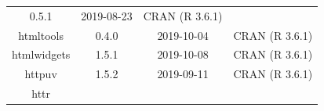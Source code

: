 \documentclass[11pt,]{book}
\begin{document}
\begin{longtable}[]{@{}cccc@{}}
\begin{minipage}[t]{0.19\columnwidth}
0.5.1\strut
\end{minipage} & \begin{minipage}[t]{0.16\columnwidth}\centering\strut
2019-08-23\strut
\end{minipage} & \begin{minipage}[t]{0.36\columnwidth}\centering\strut
CRAN (R 3.6.1)\strut
\end{minipage}\tabularnewline
\begin{minipage}[t]{0.18\columnwidth}\centering\strut
htmltools\strut
\end{minipage} & \begin{minipage}[t]{0.19\columnwidth}\centering\strut
0.4.0\strut
\end{minipage} & \begin{minipage}[t]{0.16\columnwidth}\centering\strut
2019-10-04\strut
\end{minipage} & \begin{minipage}[t]{0.36\columnwidth}\centering\strut
CRAN (R 3.6.1)\strut
\end{minipage}\tabularnewline
\begin{minipage}[t]{0.18\columnwidth}\centering\strut
htmlwidgets\strut
\end{minipage} & \begin{minipage}[t]{0.19\columnwidth}\centering\strut
1.5.1\strut
\end{minipage} & \begin{minipage}[t]{0.16\columnwidth}\centering\strut
2019-10-08\strut
\end{minipage} & \begin{minipage}[t]{0.36\columnwidth}\centering\strut
CRAN (R 3.6.1)\strut
\end{minipage}\tabularnewline
\begin{minipage}[t]{0.18\columnwidth}\centering\strut
httpuv\strut
\end{minipage} & \begin{minipage}[t]{0.19\columnwidth}\centering\strut
1.5.2\strut
\end{minipage} & \begin{minipage}[t]{0.16\columnwidth}\centering\strut
2019-09-11\strut
\end{minipage} & \begin{minipage}[t]{0.36\columnwidth}\centering\strut
CRAN (R 3.6.1)\strut
\end{minipage}\tabularnewline
\begin{minipage}[t]{0.18\columnwidth}\centering\strut
httr\strut
\end{minipage} & \begin{minipage}[t]{0.19\columnwidth}\centering\strut

\end{minipage}
\end{longtable}
\end{document}
